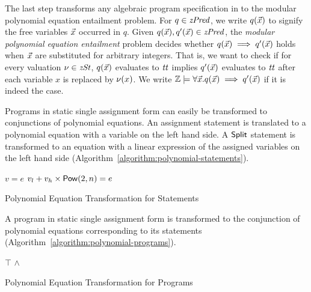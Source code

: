 
The last step transforms any algebraic program specification in \zdsl to the
modular polynomial equation entailment problem. For
$q \in \mathit{zPred}$, we write $q(\vec{x})$ to signify the free variables $\vec{x}$
occurred in $q$. Given $q(\vec{x}), q'(\vec{x}) \in \mathit{zPred}$, the \emph{modular
  polynomial equation entailment} problem decides whether
$q(\vec{x}) \implies q'(\vec{x})$ holds when $\vec{x}$ are substituted for
arbitrary integers. That is, we want to check if for every valuation $\nu \in \mathit{zSt}$, $q(\vec{x})$ evaluates to $\mathit{tt}$ implies $q'(\vec{x})$ evaluates to $\mathit{tt}$ after each variable $x$ is replaced by $\nu(x)$.
We write $\mathbb{Z} \models \forall \vec{x}. q(\vec{x}) \implies q'(\vec{x})$ if it is indeed the case.

Programs in static single assignment form can easily be transformed to
conjunctions of polynomial equations. An assignment statement is
translated to a polynomial equation with a variable on the left hand side.
A $\mbox{\textsf{Split}}$ statement is transformed to an
equation with a linear expression of the assigned variables on the
left hand side (Algorithm~\ref{algorithm:polynomial-statements}).
\begin{algorithm}
  \begin{algorithmic}[1]
        \Return $v = e$
      \EndCase
        \Return $v_l + v_h \times \mbox{\textsf{Pow}}(2, n) = e$
      \EndCase
    \EndMatch
    \EndFunction
  \end{algorithmic}
  \caption{Polynomial Equation Transformation for Statements}
  \label{algorithm:polynomial-statements}
\end{algorithm}

A program in static single assignment form is transformed to the
conjunction of polynomial equations corresponding to its statements
(Algorithm~\ref{algorithm:polynomial-programs}).

\begin{algorithm}
  \begin{algorithmic}[1]
      \Case{$\epsilon$} \Return $\top$ \EndCase
        \Return {} $\wedge$
      \EndCase
    \EndMatch
    \EndFunction
  \end{algorithmic}
  \caption{Polynomial Equation Transformation for Programs}
  \label{algorithm:polynomial-programs}
\end{algorithm}

